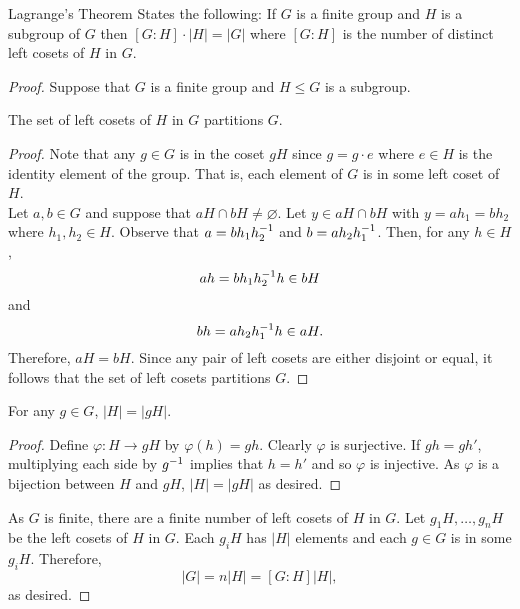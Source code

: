 \documentclass[../AlgebraQualSolutions.tex]{subfiles}
\begin{document}
	Lagrange's Theorem States the following: If $G$ is a finite group and $H$ is a subgroup of $G$ then $[G:H]\cdot|H| = |G|$ where $[G:H]$ is the number of distinct left cosets of $H$ in $G$.

	\begin{proof}
		Suppose that $G$ is a finite group and $H \leq G$ is a subgroup.

		\begin{claim}
			The set of left cosets of $H$ in $G$ partitions $G$.

			\begin{proof}
				Note that any $g \in G$ is in the coset $gH$ since $g = g\cdot e$ where $e \in H$ is the identity element of the group. That is, each element of $G$ is in some left coset of $H$.\\

				Let $a,b \in G$ and suppose that $aH \cap bH \neq \varnothing$. Let $y \in aH \cap bH$ with $y = ah_1 = bh_2$ where $h_1,h_2 \in H$. Observe that $a = bh_1h_2^{-1}$ and $b = ah_2h_1^{-1}$. Then, for any $h \in H$,
					\[ah = bh_1h_2^{-1} h \in bH \]
				and
					\[bh = ah_2h_1^{-1} h \in aH.\]
				Therefore, $aH = bH$. Since any pair of left cosets are either disjoint or equal, it follows that the set of left cosets partitions $G$.
			\end{proof}
		\end{claim}

		\begin{claim}
			For any $g \in G$, $|H| = |gH|$.

			\begin{proof}
				Define $\varphi: H \to gH$ by $\varphi(h) = gh$. Clearly $\varphi$ is surjective. If $gh = gh'$, multiplying each side by $g^{-1}$ implies that $h = h'$ and so $\varphi$ is injective. As $\varphi$ is a bijection between $H$ and $gH$, $|H| = |gH|$ as desired. 
			\end{proof}
		\end{claim}

		As $G$ is finite, there are a finite number of left cosets of $H$ in $G$. Let $g_1H, \ldots, g_nH$ be the left cosets of $H$ in $G$. Each $g_iH$ has $|H|$ elements and each $g \in G$ is in some $g_iH$. Therefore,
			\[|G| = n|H| = [G:H]|H|,\]
		as desired.
	\end{proof}
\end{document}
